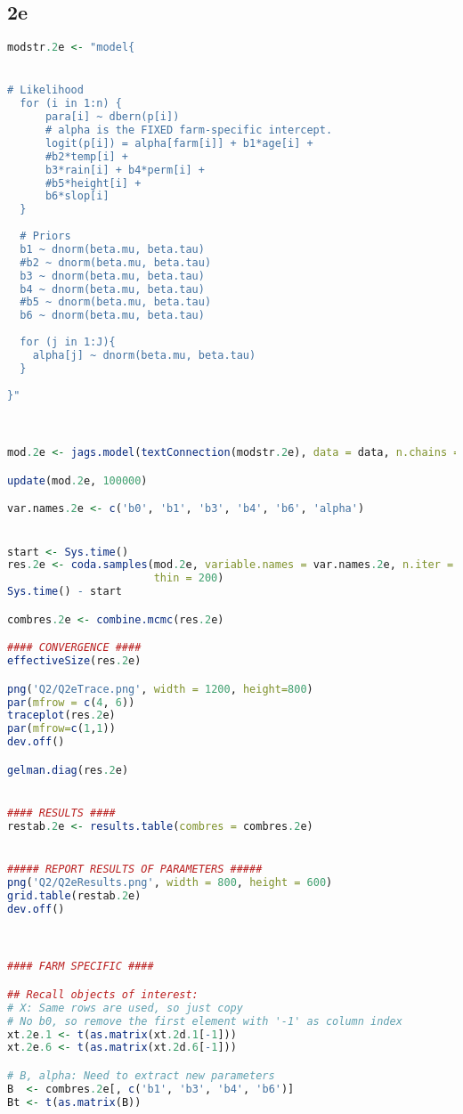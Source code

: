 \documentclass[11pt]{article}
\begin{document}
\newpage
\subsection{2e} \label{appA2e}
\begin{lstlisting}[language=R]
modstr.2e <- "model{


# Likelihood
  for (i in 1:n) {
      para[i] ~ dbern(p[i])
      # alpha is the FIXED farm-specific intercept. 
      logit(p[i]) = alpha[farm[i]] + b1*age[i] + 
      #b2*temp[i] + 
      b3*rain[i] + b4*perm[i] + 
      #b5*height[i] + 
      b6*slop[i]
  }
  
  # Priors
  b1 ~ dnorm(beta.mu, beta.tau)
  #b2 ~ dnorm(beta.mu, beta.tau)
  b3 ~ dnorm(beta.mu, beta.tau)
  b4 ~ dnorm(beta.mu, beta.tau)
  #b5 ~ dnorm(beta.mu, beta.tau)
  b6 ~ dnorm(beta.mu, beta.tau)
  
  for (j in 1:J){
    alpha[j] ~ dnorm(beta.mu, beta.tau)
  }
  
}"



mod.2e <- jags.model(textConnection(modstr.2e), data = data, n.chains = 3)

update(mod.2e, 100000)

var.names.2e <- c('b0', 'b1', 'b3', 'b4', 'b6', 'alpha')


start <- Sys.time()
res.2e <- coda.samples(mod.2e, variable.names = var.names.2e, n.iter = 400000, 
                       thin = 200)
Sys.time() - start

combres.2e <- combine.mcmc(res.2e)

#### CONVERGENCE ####
effectiveSize(res.2e)

png('Q2/Q2eTrace.png', width = 1200, height=800)
par(mfrow = c(4, 6))
traceplot(res.2e)
par(mfrow=c(1,1))
dev.off()

gelman.diag(res.2e)


#### RESULTS ####
restab.2e <- results.table(combres = combres.2e)


##### REPORT RESULTS OF PARAMETERS #####
png('Q2/Q2eResults.png', width = 800, height = 600)
grid.table(restab.2e)
dev.off()



#### FARM SPECIFIC ####

## Recall objects of interest:
# X: Same rows are used, so just copy
# No b0, so remove the first element with '-1' as column index
xt.2e.1 <- t(as.matrix(xt.2d.1[-1]))
xt.2e.6 <- t(as.matrix(xt.2d.6[-1]))

# B, alpha: Need to extract new parameters
B  <- combres.2e[, c('b1', 'b3', 'b4', 'b6')]
Bt <- t(as.matrix(B))
  

\end{lstlisting}
\end{document}
